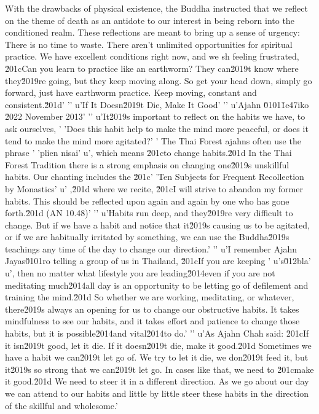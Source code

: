 With the drawbacks of physical existence, the Buddha instructed that we 
reflect on the theme of death as an antidote to our interest in being 
reborn into the conditioned realm. These reflections are meant to bring 
up a sense of urgency: There is no time to waste. There aren't 
unlimited opportunities for spiritual practice. We have excellent 
conditions right now, and we sh feeling frustrated, \u201cCan you learn to practice like an earthworm? They can\u2019t know where they\u2019re going, but they keep moving along. So get your head down, simply go forward, just have earthworm practice. Keep moving, constant and consistent.\u201d'
'\n'
u'If It Doesn\u2019t Die, Make It Good'
'\n'
u'Ajahn \u0101\u1e47iko \u2022 November 2013'
'\n'
u'It\u2019s important to reflect on the habits we have, to ask ourselves, '
'Does this habit help to make the mind more peaceful, or does it tend to make the mind more agitated?'
' The Thai Forest ajahns often use the phrase '
'plien nisai'
u', which means \u201cto change habits.\u201d In the Thai Forest Tradition there is a strong emphasis on changing one\u2019s unskillful habits. Our chanting includes the \u201c'
'Ten Subjects for Frequent Recollection by Monastics'
u' ,\u201d where we recite, \u201cI will strive to abandon my former habits. This should be reflected upon again and again by one who has gone forth.\u201d (AN 10.48)'
'\n'
u'Habits run deep, and they\u2019re very difficult to change. But if we have a habit and notice that it\u2019s causing us to be agitated, or if we are habitually irritated by something, we can use the Buddha\u2019s teachings any time of the day to change our direction.'
'\n'
u'I remember Ajahn Jayas\u0101ro telling a group of us in Thailand, \u201cIf you are keeping '
u's\u012bla'
u', then no matter what lifestyle you are leading\u2014even if you are not meditating much\u2014all day is an opportunity to be letting go of defilement and training the mind.\u201d So whether we are working, meditating, or whatever, there\u2019s always an opening for us to change our obstructive habits. It takes mindfulness to see our habits, and it takes effort and patience to change those habits, but it is possible\u2014and vital\u2014to do.'
'\n'
u'As Ajahn Chah said: \u201cIf it isn\u2019t good, let it die. If it doesn\u2019t die, make it good.\u201d Sometimes we have a habit we can\u2019t let go of. We try to let it die, we don\u2019t feed it, but it\u2019s so strong that we can\u2019t let go. In cases like that, we need to \u201cmake it good.\u201d We need to steer it in a different direction. As we go about our day we can attend to our habits and little by little steer these habits in the direction of the skillful and wholesome.'
